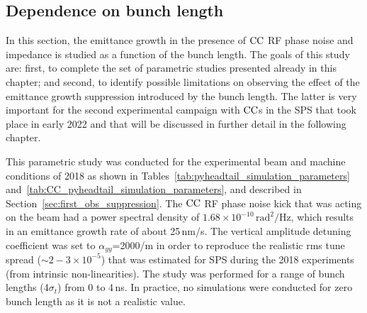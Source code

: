 





\subsection{Dependence on bunch length}\label{subsec:dependence_on_sigma_z}

In this section, the emittance growth in the presence of ${\mathrm{CC}}$ RF phase noise and impedance is studied as a function of the bunch length. The goals of this study are: first, to complete the set of parametric studies presented already in this chapter; and second, to identify possible limitations on observing the effect of the emittance growth suppression introduced by the bunch length. The latter is very important for the second experimental campaign with ${\mathrm{CC}}$s in the SPS that took place in early 2022 and that will be discussed in further detail in the following chapter.

This parametric study was conducted for the experimental beam and machine conditions of 2018 as shown in Tables~\ref{tab:pyheadtail_simulation_parameters} and~\ref{tab:CC_pyheadtail_simulation_parameters}, and described in Section~\ref{sec:first_obs_suppression}. The ${\mathrm{CC}}$ RF phase noise kick that was acting on the beam had a power spectral density of $1.68 \times 10^{-10}$\,$\mathrm{rad^2/Hz}$, which results in an emittance growth rate of about 25\,nm/s. The vertical amplitude detuning coefficient was set to $\alpha_{yy}$=2000/m in order to reproduce the realistic rms tune spread ($\sim 2-3 \times 10^{-5}$) that was estimated for SPS during the 2018 experiments (from intrinsic non-linearities). The study was performed for a range of bunch lengths (4$\sigma_t$) from 0 to 4\,ns. In practice, no simulations were conducted for zero bunch length as it is not a realistic value.


